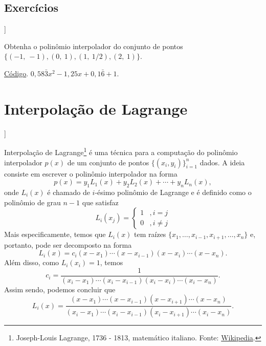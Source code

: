 \subsection*{Exercícios}

\begin{flushleft}
  [[tag:revisar]]
\end{flushleft}

\begin{exer}\label{exer:interpoli_intro1}
  Obtenha o polinômio interpolador do conjunto de pontos $\{(-1,~-1), (0,~1), (1,~1/2), (2,~1)\}$.
\end{exer}
\begin{resp}
\ifisoctave
\href{https://github.com/phkonzen/notas/blob/master/src/MatematicaNumerica/cap_interp/dados/exer_interpoli_intro1/exer_interpoli_intro1.m}{Código}.
\fi
$0,58\bar{3}x^2 - 1,25x + 0,1\bar{6} + 1$.  
\end{resp}

\section{Interpolação de Lagrange}\label{cap_interp_sec_lagrange}

\begin{flushleft}
  [[tag:revisar]]
\end{flushleft}

Interpolação de Lagrange\footnote{Joseph-Louis Lagrange, 1736 - 1813, matemático italiano. Fonte: \href{https://en.wikipedia.org/wiki/Joseph-Louis_Lagrange}{Wikipedia}.} é uma técnica para a computação do polinômio interpolador $p(x)$ de um conjunto de pontos $\{(x_i, y_i)\}_{i=1}^n$ dados. A ideia consiste em escrever o polinômio interpolador na forma
\begin{equation}
  p(x) = y_1L_1(x) + y_2L_2(x) + \cdots + y_nL_n(x),
\end{equation}
onde $L_i(x)$ é chamado de $i$-ésimo polinômio de Lagrange e é definido como o polinômio de grau $n-1$ que satisfaz
\begin{equation}
  L_i(x_j) = \left\{
    \begin{array}{ll}
      1 &, i=j\\
      0 &, i\neq j
    \end{array}
\right.
\end{equation}
Mais especificamente, temos que $L_i(x)$ tem raízes $\{x_1, \ldots, x_{i-1}, x_{i+1}, \ldots, x_n\}$ e, portanto, pode ser decomposto na forma
\begin{equation}
  L_i(x) = c_i(x-x_1)\cdots(x-x_{i-1})(x-x_i)\cdots(x-x_n).
\end{equation}
Além disso, como $L_i(x_i) = 1$, temos
\begin{equation}
  c_i = \frac{1}{(x_i-x_1)\cdots(x_i-x_{i-1})(x_i-x_i)\cdots(x_i-x_n)}.
\end{equation}
Assim sendo, podemos concluir que
\begin{equation}
  L_i(x) = \frac{(x-x_1)\cdots(x-x_{i-1})(x-x_{i+1})\cdots(x-x_n)}{(x_i-x_1)\cdots(x_i-x_{i-1})(x_i-x_{i+1})\cdots(x_i-x_n)}.
\end{equation}


